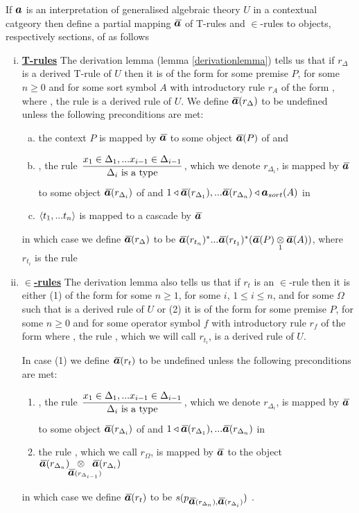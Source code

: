 \begin{definition} 
If $\iI$ is an interpretation of generalised algebraic theory $U$ in a contextual catgeory \catcw
then define a
partial mapping $\Ibar$  of T-rules and $\in$-rules to objects, respectively sections, of \catcw
as follows
\begin{enumerate}[(i)] 
\item \underline{\textbf{T-rules}} 
The derivation lemma (lemma \ref{derivationlemma}) tells us that if $r_\Delta$ is a derived T-rule of $U$  then it is of the form  for some premise $P$, for some $n \geq 0$ and for some sort symbol $A$ with introductory rule $r_A$ of the form , where \foreachi, the rule 
  is a derived rule of $U$. 
We define $\Ibar(r_\Delta)$ to be undefined unless the following preconditions are met:
\begin{enumerate}[(a)]
\item
the context  $P$ is mapped by $\Ibar$ to some object $\Ibar(P)$ of \catcw and 
\item
\foreachi, the rule $\IDelta{i}$, which we denote $r_{\Delta_i}$, is mapped by $\Ibar$ to some object $\Ibar(r_{\Delta_i})$ of \catcw
and $1 \base \Ibar(r_{\Delta_1}),...\Ibar(r_{\Delta_n}) \base \iI_{sort}(A)$ in \catcw 
\item
$\langle t_1,...t_n\rangle$ is mapped to a cascade by $\Ibar$
\end{enumerate}
in which case we define $\Ibar(r_\Delta)$ to be $\Ibar(r_{t_n})^*...\Ibar(r_{t_1})^*(\crossx{\Ibar(P)}{\Ibar(A)}{1})$,
where $r_{t_i}$ is the rule 
\item \underline{\textbf{$\boldsymbol {\in}$-rules}} 
The derivation lemma also tells us that if $r_t$ is an $\in$-rule then it is  
either (1) of the form  for some $n \ge 1$, for some $i$, $1 \leq i \leq n$, 
and for some $\Omega$ such that  is a derived rule of $U$
or (2) it is of the form  for some premise $P$, for some $n \geq 0$ and for some operator symbol $f$ with introductory rule $r_f$ of the form  where \foreachi, the rule 
, which we will call $r_{t_i}$, is a derived rule of $U$. 

In  case (1) we define $\Ibar(r_t)$ to be undefined unless  the following preconditions are met:
\begin{enumerate}
\item
\foreachi, the rule $\IDelta{i}$, which we denote $r_{\Delta_i}$, is mapped by $\Ibar$ to some object $\Ibar(r_{\Delta_i})$ of \catcw
and $1 \base \Ibar(r_{\Delta_1}),...\Ibar(r_{\Delta_n})$ in \catcw 
\item the rule , which we call $r_\Omega$, 
is mapped by $\Ibar$ to the object $\crossx{\Ibar(r_{\Delta_n})}{\Ibar(r_{\Delta_i})}{\kern-4pt\Ibar(r_{\Delta_{i-1}})\kern-12pt}$
\end{enumerate}
in which case we define $\Ibar(r_t)$ to be $s(p_{\Ibar(r_{\Delta_n}),\Ibar(r_{\Delta_i})})$ . 


\end{enumerate}
\end{definition}
